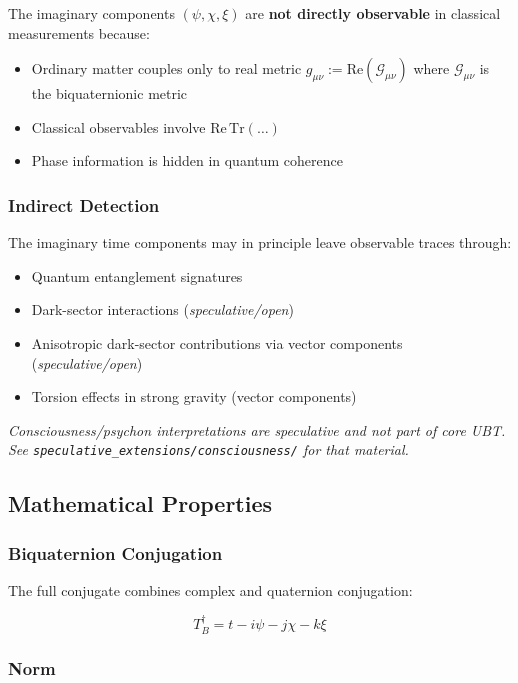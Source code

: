 The imaginary components $(\psi, \chi, \xi)$ are \textbf{not directly observable} in classical measurements because:
\begin{itemize}
    \item Ordinary matter couples only to real metric $g_{\mu\nu} := \text{Re}(\mathcal{G}_{\mu\nu})$ where $\mathcal{G}_{\mu\nu}$ is the biquaternionic metric
    \item Classical observables involve $\text{Re}\,\text{Tr}(\ldots)$
    \item Phase information is hidden in quantum coherence
\end{itemize}

\subsubsection{Indirect Detection}

The imaginary time components may in principle leave observable traces through:
\begin{itemize}
    \item Quantum entanglement signatures
    \item Dark-sector interactions (\textit{speculative/open})
    \item Anisotropic dark-sector contributions via vector components (\textit{speculative/open})
    \item Torsion effects in strong gravity (vector components)
\end{itemize}

\textit{Consciousness/psychon interpretations are speculative and not part of core UBT.
See \texttt{speculative\_extensions/consciousness/} for that material.}

\subsection{Mathematical Properties}

\subsubsection{Biquaternion Conjugation}

The full conjugate combines complex and quaternion conjugation:

\begin{equation}
\label{eq:canonical:tb_conjugate}
T_B^\dagger = t - i\psi - j\chi - k\xi
\end{equation}

\subsubsection{Norm}

